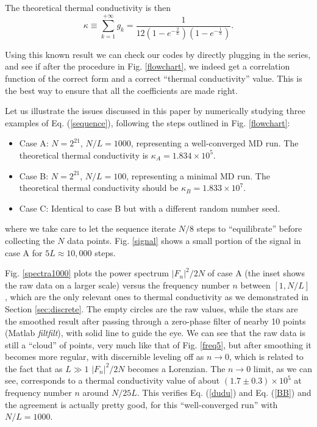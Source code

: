 The theoretical thermal conductivity is then
\begin{equation} 
\kappa \equiv \sum_{k=1}^{+\infty} g_k = 
\frac{1}{12(1-e^{-\frac{2}{L}})(1-e^{-\frac{1}{L}})}.
\end{equation}

Using this known result we can check our codes by directly plugging in
the series, and see if after the procedure in Fig.  \ref{flowchart},
we indeed get a correlation function of the correct form and a correct
``thermal conductivity'' value. This is the best way to ensure that
all the coefficients are made right.

Let us illustrate the issues discussed in this paper by numerically
studying three examples of Eq. (\ref{sequence}), following the steps
outlined in Fig. \ref{flowchart}:
\begin{itemize}
\item Case A: $N = 2^{21}$, $N/L = 1000$, representing a well-converged
  MD run. The theoretical thermal conductivity is $\kappa_{A} = 1.834
  \times 10^5$.
\item Case B: $N = 2^{21}$, $N/L = 100$, representing a minimal MD
  run\cite{explain_minimal}.  The theoretical thermal conductivity
  should be $\kappa_{B} = 1.833 \times 10^7$.
\item Case C: Identical to case B but with a different random number
  seed.
\end{itemize}
where we take care to let the sequence iterate $N/8$ steps to
``equilibrate'' before collecting the $N$ data points.  Fig.
\ref{signal} shows a small portion of the signal in case A for $5L
\approx 10,000$ steps.

Fig. \ref{spectra1000} plots the power spectrum $|F_n|^2/2N$ of case A
(the inset shows the raw data on a larger scale) versus the frequency
number $n$ between $[1, N/L]$, which are the only relevant ones to
thermal conductivity as we demonstrated in Section
\ref{sec:discrete}\cite{explain_minimal}.  The empty circles are the
raw values, while the stars are the smoothed result after passing
through a zero-phase filter of nearby 10 points (Matlab {\em
  filtfilt}), with solid line to guide the eye. We can see that the
raw data is still a ``cloud'' of points, very much like that of Fig.
\ref{freq5}, but after smoothing it becomes more regular, with
discernible leveling off as $n \rightarrow 0$, which is related to the
fact that as $L\gg 1$ $|F_n|^2/2N$ becomes a Lorenzian. The $n
\rightarrow 0$ limit, as we can see, corresponds to a thermal
conductivity value of about $(1.7\pm 0.3)\times 10^5$ at frequency
number $n$ around $N/25L$. This verifies Eq. (\ref{dudu}) and Eq.
(\ref{BB}) and the agreement is actually pretty good, for this
``well-converged run'' with $N/L = 1000$.

